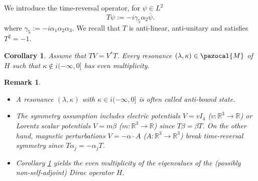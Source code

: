 \documentclass[a4paper, 12pt]{amsart}
\numberwithin{equation}{section}
\newtheorem{corollary}{Corollary}[section]
\newtheorem{remark}{Remark}[section]
\newcommand{\R}{\mathbb{R}} %
\newcommand{\Mpaz}{\pazocal{M}}
\begin{document}
We introduce the time-reversal operator, for $\psi\in L^2$
\begin{equation*}
    T\psi:=-i\gamma_5\alpha_2\overline{\psi}.
\end{equation*} 
where $\gamma_5:=-i\alpha_1\alpha_2\alpha_3$. We recall that $T$ is anti-linear, anti-unitary and satisfies $T^2=-1$. 

\begin{corollary}\label{KramersDegeneracy}
    Assume that $TV=V^*T$. Every resonance $(\lambda,\kappa)\in\Mpaz$ of $H$ such that $\kappa\not\in i(-\infty,0]$ has even multiplicity. 
\end{corollary}

\begin{remark}
    \begin{itemize}
        \item A resonance $(\lambda,\kappa)$ with $\kappa\in i(-\infty,0]$ is often called anti-bound state.
        
        \item The symmetry assumption includes electric potentials $V=vI_4$ ($v:\R^3\rightarrow\R$) or Lorentz scalar potentials $V=m\beta$ ($m:\R^3\to\R$) since $T\beta=\beta T$. On the other hand, magnetic perturbations $V=-\alpha\cdot A$ ($A:\R^3\rightarrow\R^3$) break time-reversal symmetry since $T\alpha_j=-\alpha_j T$.

        \item Corollary \ref{KramersDegeneracy} yields the even multiplicity of the eigenvalues of the (possibly non-self-adjoint) Dirac operator $H$.
    \end{itemize} 
\end{remark}
\end{document}
